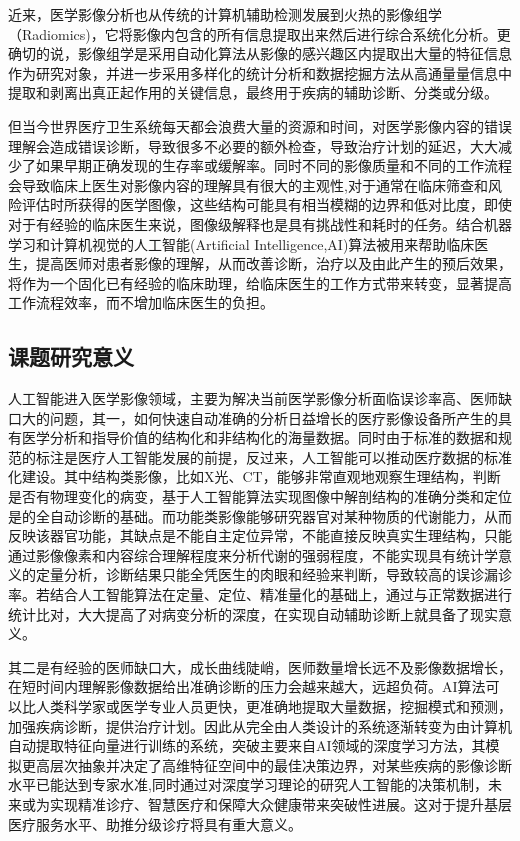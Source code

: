 近来，医学影像分析也从传统的计算机辅助检测发展到火热的影像组学（Radiomics)\citep{Lambin2015}，它将影像内包含的所有信息提取出来然后进行综合系统化分析。更确切的说，影像组学是采用自动化算法从影像的感兴趣区内提取出大量的特征信息作为研究对象，并进一步采用多样化的统计分析和数据挖掘方法从高通量量信息中提取和剥离出真正起作用的关键信息，最终用于疾病的辅助诊断、分类或分级。

但当今世界医疗卫生系统每天都会浪费大量的资源和时间，对医学影像内容的错误理解会造成错误诊断，导致很多不必要的额外检查，导致治疗计划的延迟，大大减少了如果早期正确发现的生存率或缓解率。同时不同的影像质量和不同的工作流程会导致临床上医生对影像内容的理解具有很大的主观性,对于通常在临床筛查和风险评估时所获得的医学图像，这些结构可能具有相当模糊的边界和低对比度，即使对于有经验的临床医生来说，图像级解释也是具有挑战性和耗时的任务。结合机器学习和计算机视觉的人工智能(Artificial Intelligence,AI)算法被用来帮助临床医生，提高医师对患者影像的理解，从而改善诊断，治疗以及由此产生的预后效果，将作为一个固化已有经验的临床助理，给临床医生的工作方式带来转变，显著提高工作流程效率，而不增加临床医生的负担。
\subsection{课题研究意义}

人工智能进入医学影像领域，主要为解决当前医学影像分析面临误诊率高、医师缺口大的问题，其一，如何快速自动准确的分析日益增长的医疗影像设备所产生的具有医学分析和指导价值的结构化和非结构化的海量数据。同时由于标准的数据和规范的标注是医疗人工智能发展的前提，反过来，人工智能可以推动医疗数据的标准化建设。其中结构类影像，比如X光、CT，能够非常直观地观察生理结构，判断是否有物理变化的病变，基于人工智能算法实现图像中解剖结构的准确分类和定位是的全自动诊断的基础。而功能类影像能够研究器官对某种物质的代谢能力，从而反映该器官功能，其缺点是不能自主定位异常，不能直接反映真实生理结构，只能通过影像像素和内容综合理解程度来分析代谢的强弱程度，不能实现具有统计学意义的定量分析，诊断结果只能全凭医生的肉眼和经验来判断，导致较高的误诊漏诊率。若结合人工智能算法在定量、定位、精准量化的基础上，通过与正常数据进行统计比对，大大提高了对病变分析的深度，在实现自动辅助诊断上就具备了现实意义。

其二是有经验的医师缺口大，成长曲线陡峭，医师数量增长远不及影像数据增长，在短时间内理解影像数据给出准确诊断的压力会越来越大，远超负荷。AI算法可以比人类科学家或医学专业人员更快，更准确地提取大量数据，挖掘模式和预测，加强疾病诊断，提供治疗计划。因此从完全由人类设计的系统逐渐转变为由计算机自动提取特征向量进行训练的系统，突破主要来自AI领域的深度学习方法，其模拟更高层次抽象并决定了高维特征空间中的最佳决策边界，对某些疾病的影像诊断水平已能达到专家水准,同时通过对深度学习理论的研究人工智能的决策机制，未来或为实现精准诊疗、智慧医疗和保障大众健康带来突破性进展。这对于提升基层医疗服务水平、助推分级诊疗将具有重大意义。

